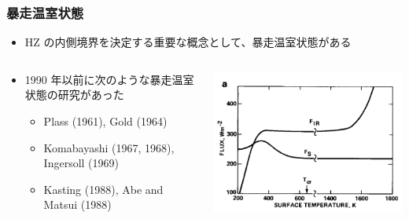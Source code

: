 \documentclass[aspectratio=149,9pt,fleqn]{beamer}
\begin{document}
\begin{frame}
	\frametitle{暴走温室状態}
	\begin{itemize}
		\item HZ の内側境界を決定する重要な概念として、暴走温室状態がある
	\end{itemize}
	\begin{columns}[T,onlytextwidth]
		\begin{column}{.68\textwidth}
			\begin{itemize}
				\item 1990 年以前に次のような暴走温室状態の研究があった
					\begin{itemize}
						\item Plass (1961), Gold (1964)
						\item Komabayashi (1967, 1968), Ingersoll (1969)
						\item Kasting (1988), Abe and Matsui (1988)
					\end{itemize}
			\end{itemize}
		\end{column}
		\begin{column}{.3\textwidth}
			\centering\scriptsize
			\includegraphics[width=.95\textwidth]{kasting7a.png}\\

\end{column}
\end{columns}
\end{frame}
\end{document}
